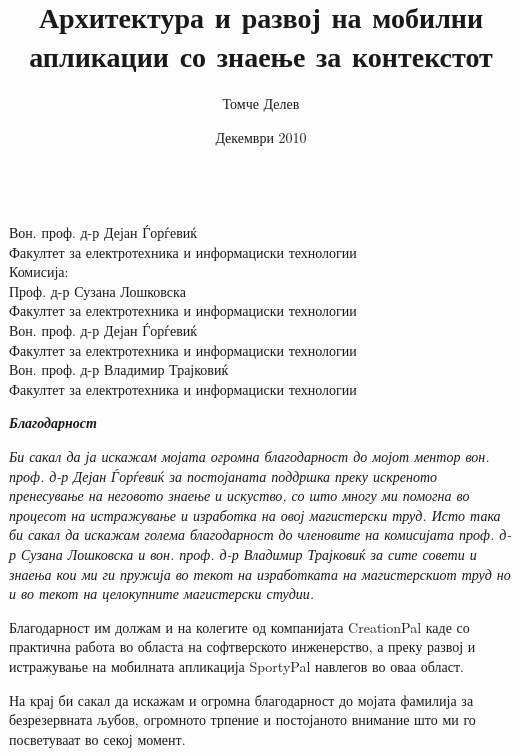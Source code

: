 \documentclass[a4paper,oneside]{report}
\begin{document}
\title{Архитектура и развој на мобилни апликации со знаење за контекстот}
\author{Томче Делев}
\date{Декември 2010}
\maketitle

{}\\
Вон. проф. д-р Дејан Ѓорѓевиќ\\
Факултет за електротехника и информациски технологии
\\[.5cm]
Комисија:\\
Проф. д-р Сузана Лошковска\\
Факултет за електротехника и информациски технологии
\\[.5cm]
Вон. проф. д-р Дејан Ѓорѓевиќ\\
Факултет за електротехника и информациски технологии
\\[.5cm]
Вон. проф. д-р Владимир Трајковиќ\\
Факултет за електротехника и информациски технологии


\newpage

\newpage
\begin{center}
{\Large{\it\textbf{Благодарност}}}
\\[2cm]
{\it
Би сакал да ја искажам мојата огромна благодарност до мојот ментор вон. проф.
д-р Дејан Ѓорѓевиќ за постојаната поддршка преку искреното пренесување на
неговото знаење и искуство, со што многу ми помогна во процесот на истражување и
изработка на овој магистерски труд. Исто така би сакал да искажам голема
благодарност до членовите на комисијата проф. д-р Сузана Лошковска и вон. проф.
д-р Владимир Трајковиќ за сите совети и знаења кои ми ги пружија во текот на
изработката на магистерскиот труд но и во текот на целокупните магистерски
студии.

Благодарност им должам и на колегите од компанијата CreationPal каде со
практична работа во областа на софтверското инженерство, а преку развој и
истражување на мобилната апликација SportyPal навлегов во оваа област.

На крај би сакал да искажам и огромна благодарност до мојата фамилија за
безрезервната љубов, огромното трпение и постојаното внимание што ми го
посветуваат во секој момент.
}
\end{center}

\tableofcontents
\listoffigures
\listoftables










\end{document}
